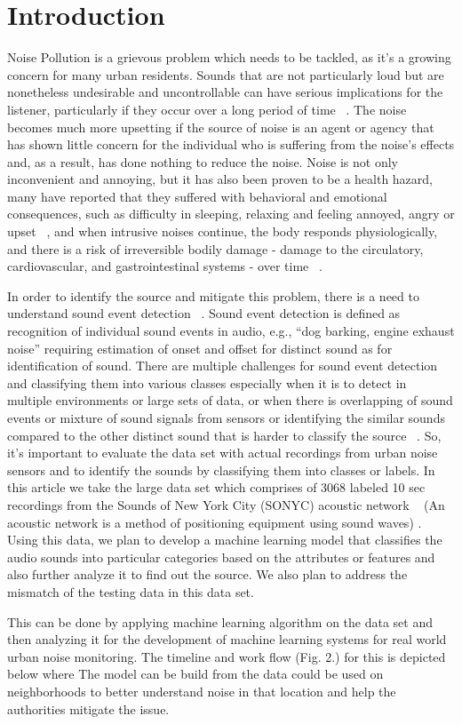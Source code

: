 \section{Introduction}
Noise Pollution is a grievous problem which needs to be tackled, as it’s a growing concern for many urban residents. Sounds that are not particularly loud but are nonetheless undesirable and uncontrollable can have serious implications for the listener, particularly if they occur over a long period of time ~\cite{3}. The noise becomes much more upsetting if the source of noise is an agent or agency that has shown little concern for the individual who is suffering from the noise's effects and, as a result, has done nothing to reduce the noise. Noise is not only inconvenient and annoying, but it has also been proven to be a health hazard, many have reported that they suffered with behavioral and emotional consequences, such as difficulty in sleeping, relaxing and feeling annoyed, angry or upset ~\cite{2}, and when intrusive noises continue, the body responds physiologically, and there is a risk of irreversible bodily damage - damage to the circulatory, cardiovascular, and gastrointestinal systems - over time ~\cite{1}.


In order to identify the source and mitigate this problem, there is a need to understand sound event detection ~\cite{6}. Sound event detection is defined as recognition of individual sound events in audio, e.g., “dog barking, engine exhaust noise” requiring estimation of onset and offset for distinct sound as for identification of sound. There are multiple challenges for sound event detection and classifying them into various classes especially when it is to detect in multiple environments or large sets of data, or when there is overlapping of sound events or mixture of sound signals from sensors or identifying the similar sounds compared to the other distinct sound that is harder to classify the source ~\cite{8}. So, it's important to evaluate the data set with actual recordings from urban noise sensors and to identify the sounds by classifying them into classes or labels. In this article we take the large data set which comprises of 3068 labeled 10 sec recordings from the Sounds of New York City (SONYC) acoustic network ~\cite{7} (An acoustic network is a method of positioning equipment using sound waves) . Using this data, we plan to develop a machine learning model that classifies the audio sounds into particular categories based on the attributes or features and also further analyze it to find out the source. We also plan to address the mismatch of the testing data in this data set.

This can be done by applying machine learning algorithm on the data set and then analyzing it for the development of machine learning systems for real world urban noise monitoring. The timeline and work flow (Fig. 2.) for this is depicted below where The model can be build from the data could be used on neighborhoods to better understand noise in that location and help the authorities mitigate the issue.   